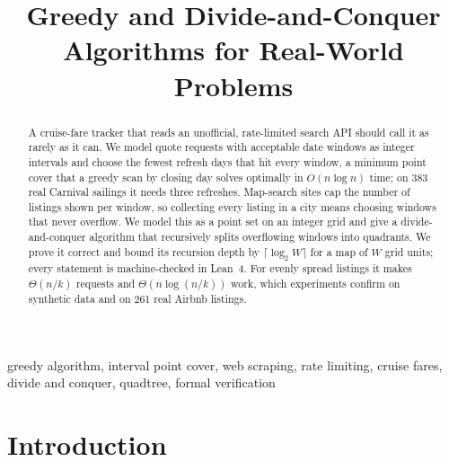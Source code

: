 \documentclass[conference]{IEEEtran}
\theoremstyle{spaced}
\begin{document}
\title{Greedy and Divide-and-Conquer Algorithms for Real-World Problems}

\author{
\and
{}
}

\maketitle

\begin{abstract}
A cruise-fare tracker that reads an unofficial, rate-limited search API
should call it as rarely as it can. We model quote requests with acceptable
date windows as integer intervals and choose the fewest refresh days that hit
every window, a minimum point cover that a greedy scan by closing day solves
optimally in $O(n\log n)$ time; on $383$ real Carnival sailings it needs three
refreshes.
Map-search sites cap the number of listings shown per window, so collecting
every listing in a city means choosing windows that never overflow. We model
this as a point set on an integer grid and give a divide-and-conquer algorithm
that recursively splits overflowing windows into quadrants. We prove it
correct and bound its recursion depth by $\lceil\log_2 W\rceil$ for a map of
$W$ grid units; every statement is machine-checked in Lean~4. For evenly
spread listings it makes $\Theta(n/k)$ requests and $\Theta(n\log(n/k))$
work, which experiments confirm on synthetic data and on 261 real Airbnb
listings.
\end{abstract}

\begin{IEEEkeywords}
greedy algorithm, interval point cover, web scraping, rate limiting, cruise
fares, divide and conquer, quadtree,
formal verification
\end{IEEEkeywords}

\section{Introduction}
\end{document}
